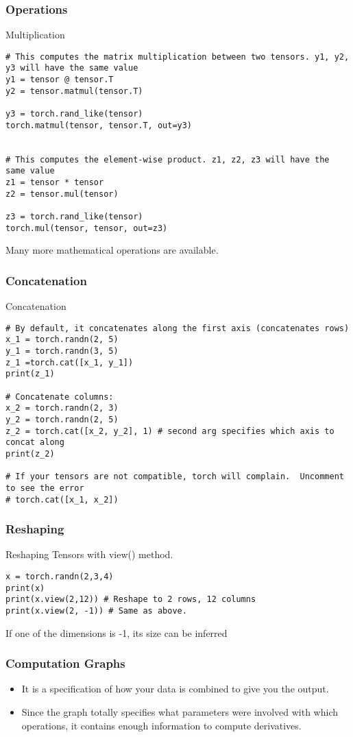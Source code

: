 \begin{frame}[fragile]
\frametitle{Operations}
Multiplication

\begin{lstlisting}
# This computes the matrix multiplication between two tensors. y1, y2, y3 will have the same value
y1 = tensor @ tensor.T
y2 = tensor.matmul(tensor.T)

y3 = torch.rand_like(tensor)
torch.matmul(tensor, tensor.T, out=y3)


# This computes the element-wise product. z1, z2, z3 will have the same value
z1 = tensor * tensor
z2 = tensor.mul(tensor)

z3 = torch.rand_like(tensor)
torch.mul(tensor, tensor, out=z3)
 \end{lstlisting}
Many more mathematical operations are available.
 \end{frame} 
 
 
\begin{frame}[fragile]
\frametitle{Concatenation}
Concatenation
 \begin{lstlisting}
# By default, it concatenates along the first axis (concatenates rows)
x_1 = torch.randn(2, 5)
y_1 = torch.randn(3, 5)
z_1 =torch.cat([x_1, y_1])
print(z_1)

# Concatenate columns:
x_2 = torch.randn(2, 3)
y_2 = torch.randn(2, 5)
z_2 = torch.cat([x_2, y_2], 1) # second arg specifies which axis to concat along
print(z_2)

# If your tensors are not compatible, torch will complain.  Uncomment to see the error
# torch.cat([x_1, x_2])
 \end{lstlisting}
 \end{frame} 
 
\begin{frame}[fragile]
\frametitle{Reshaping}
Reshaping Tensors with view() method.
 \begin{lstlisting}
x = torch.randn(2,3,4)
print(x)
print(x.view(2,12)) # Reshape to 2 rows, 12 columns
print(x.view(2, -1)) # Same as above. 
 \end{lstlisting}
  If one of the dimensions is -1, its size can be inferred
 \end{frame} 
 
\begin{frame}[fragile]
\frametitle{Computation Graphs}

\begin{itemize}
\item It is a specification of how your data is combined to give you the output. 
\item Since the graph totally specifies what parameters were involved with which operations, it contains enough information to compute derivatives.
\end{itemize}
 \end{frame} 
 
